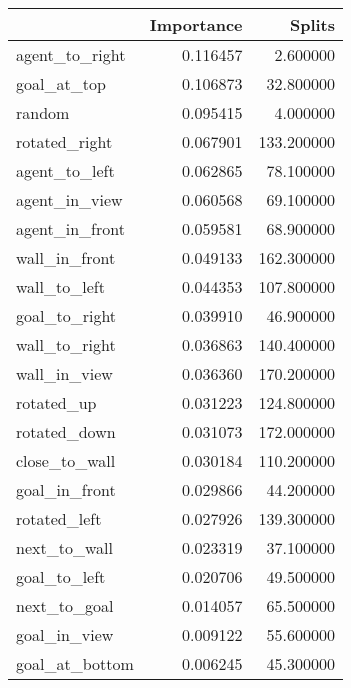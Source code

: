 \begin{tabular}{lrr}
\toprule
 & Importance & Splits \\
\midrule
agent\_to\_right & 0.116457 & 2.600000 \\
goal\_at\_top & 0.106873 & 32.800000 \\
random & 0.095415 & 4.000000 \\
rotated\_right & 0.067901 & 133.200000 \\
agent\_to\_left & 0.062865 & 78.100000 \\
agent\_in\_view & 0.060568 & 69.100000 \\
agent\_in\_front & 0.059581 & 68.900000 \\
wall\_in\_front & 0.049133 & 162.300000 \\
wall\_to\_left & 0.044353 & 107.800000 \\
goal\_to\_right & 0.039910 & 46.900000 \\
wall\_to\_right & 0.036863 & 140.400000 \\
wall\_in\_view & 0.036360 & 170.200000 \\
rotated\_up & 0.031223 & 124.800000 \\
rotated\_down & 0.031073 & 172.000000 \\
close\_to\_wall & 0.030184 & 110.200000 \\
goal\_in\_front & 0.029866 & 44.200000 \\
rotated\_left & 0.027926 & 139.300000 \\
next\_to\_wall & 0.023319 & 37.100000 \\
goal\_to\_left & 0.020706 & 49.500000 \\
next\_to\_goal & 0.014057 & 65.500000 \\
goal\_in\_view & 0.009122 & 55.600000 \\
goal\_at\_bottom & 0.006245 & 45.300000 \\
\bottomrule
\end{tabular}